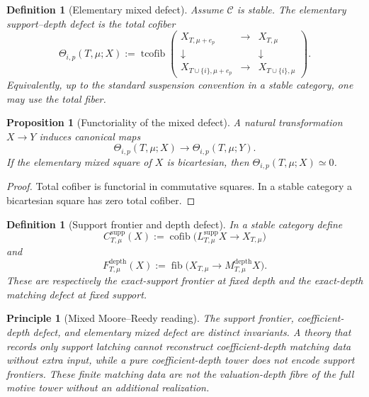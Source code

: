 \documentclass[11pt]{article}
\newtheorem{proposition}[theorem]{Proposition}
\newtheorem{definition}[theorem]{Definition}
\newtheorem{principle}[theorem]{Principle}
\theoremstyle{remark}
\newcommand{\cofib}{\operatorname{cofib}}
\providecommand{\fib}{\operatorname{fib}}
\providecommand{\tcofib}{\operatorname{tcofib}}
\begin{document}
\begin{definition}[Elementary mixed defect]
Assume \(\mathcal C\) is stable.  The elementary support--depth defect is the total cofiber
\[
 \boxed{
 \Theta_{i,p}(T,\mu;X)
 :=\tcofib
 \begin{pmatrix}
 X_{T,\mu+e_p} &\longrightarrow& X_{T,\mu}\\
 \downarrow &&\downarrow\\
 X_{T\cup\{i\},\mu+e_p}&\longrightarrow&X_{T\cup\{i\},\mu}
 \end{pmatrix}.}
\]
Equivalently, up to the standard suspension convention in a stable category, one may use the total fiber.
\end{definition}

\begin{proposition}[Functoriality of the mixed defect]\label{P1C-prop:mixed-defect-functorial}
A natural transformation \(X\to Y\) induces canonical maps
\[
 \Theta_{i,p}(T,\mu;X)
 \longrightarrow
 \Theta_{i,p}(T,\mu;Y).
\]
If the elementary mixed square of \(X\) is bicartesian, then \(\Theta_{i,p}(T,\mu;X)\simeq0\).
\end{proposition}

\begin{proof}
Total cofiber is functorial in commutative squares.  In a stable category a bicartesian square has zero total cofiber.
\end{proof}

\begin{definition}[Support frontier and depth defect]
In a stable category define
\[
 C^{\mathrm{supp}}_{T,\mu}(X)
 :=\cofib\bigl(L^{\mathrm{supp}}_{T,\mu}X\to X_{T,\mu}\bigr)
\]
and
\[
 F^{\mathrm{depth}}_{T,\mu}(X)
 :=\fib\bigl(X_{T,\mu}\to M^{\mathrm{depth}}_{T,\mu}X\bigr).
\]
These are respectively the exact-support frontier at fixed depth and the exact-depth matching defect at fixed support.
\end{definition}

\begin{principle}[Mixed Moore--Reedy reading]
The support frontier, coefficient-depth defect, and elementary mixed defect are
distinct invariants.  A theory that records only support latching cannot reconstruct
coefficient-depth matching data without extra input, while a pure coefficient-depth
tower does not encode support frontiers.  These finite matching data are not the
valuation-depth fibre of the full motive tower without an additional realization.
\end{principle}
\end{document}
